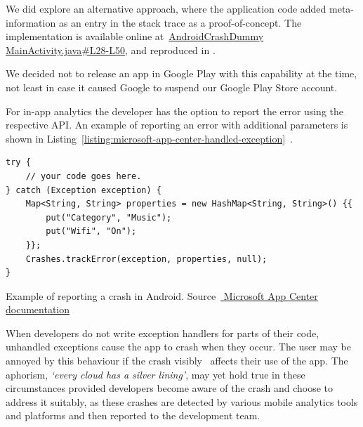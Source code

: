 \begin{kaobox}[frametitle=An alternative approach]
We did explore an alternative approach, where the application code added meta-information as an entry in the stack trace as a proof-of-concept. 
The implementation is available online at~\href{https://github.com/ISNIT0/AndroidCrashDummy/blob/cfa7f0817c436d7e657741e0a5d9a76644e5a898/app/src/main/java/com/example/user/androidtestapp/MainActivity.java\#L28-L50}{AndroidCrashDummy MainActivity.java\#L28-L50}, and reproduced in . 

We decided not to release an app in Google Play with this capability at the time, not least in case it caused Google to suspend our Google Play Store account. 
\end{kaobox}

For in-app analytics the developer has the option to report the error using the respective API. An example of reporting an error with additional parameters is shown in Listing~\ref{listing:microsoft-app-center-handled-exception}~.

\begin{listing}
\begin{verbatim}
try {
    // your code goes here.
} catch (Exception exception) {
    Map<String, String> properties = new HashMap<String, String>() {{
        put("Category", "Music");
        put("Wifi", "On");
    }};
    Crashes.trackError(exception, properties, null);
}
\end{verbatim}
\caption[Microsoft AppCenter: example of reporting a crash in Android]{Example of reporting a crash in Android.  Source~\href{https://docs.microsoft.com/en-us/appcenter/sdk/crashes/android}{ Microsoft App Center documentation}}
\label{listing:microsoft-app-center-handled-exception}
\end{listing}


When developers do not write exception handlers for parts of their code, unhandled exceptions cause the app to crash when they occur. The user may be annoyed by this behaviour if the crash visibly~ affects their use of the app. The aphorism, \emph{`every cloud has a silver lining'}, may yet hold true in these circumstances provided developers become aware of the crash and choose to address it suitably, as these crashes are detected by various mobile analytics tools and platforms and then reported to the development team.

